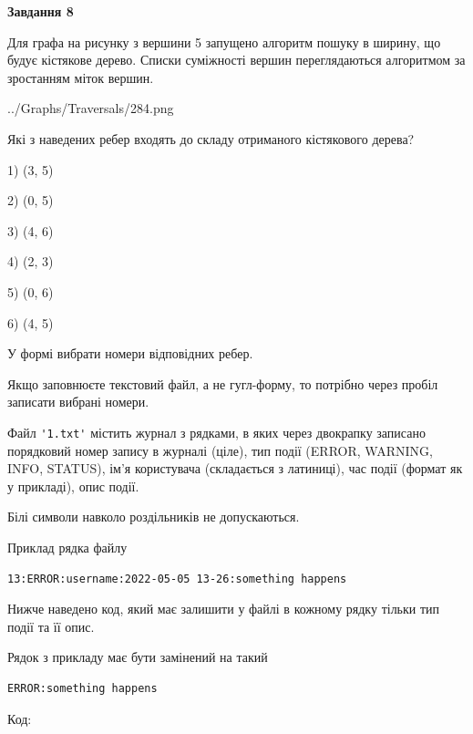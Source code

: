 \documentclass[12pt, ukrainian]{article}
\def\code#1{\Verb!#1!}
\begin{document}
{\begin {large}
{\begin {center}\textbf{Завдання 8}\end {center}}\par
Для графа на рисунку з вершини 5 запущено алгоритм пошуку в ширину, що будує кістякове дерево. Списки суміжності вершин переглядаються алгоритмом за зростанням міток вершин.\par
\begin{center}
	{../Graphs/Traversals/284.png}
\end{center}
\par Які з наведених ребер входять до складу отриманого кістякового дерева?\par
1) (3, 5)\par
2) (0, 5)\par
3) (4, 6)\par
4) (2, 3)\par
5) (0, 6)\par
6) (4, 5)\par
{\vskip 15pt} У формі вибрати номери відповідних ребер.


Якщо заповнюєте текстовий файл, а не гугл-форму, то потрібно через пробіл записа\-ти вибрані номери.\par
\newpage


Файл \code{'1.txt'} містить журнал з рядками, в яких через двокрапку записано поряд\-ко\-вий номер запису в журналі (ціле), тип події (ERROR, WARNING, INFO, STATUS), ім'я користувача (складається з латиниці), час події (фор\-мат як у прикладі), опис події.

Білі символи навколо роздільників не допускаються.

Приклад рядка файлу



\begin{verbatim}
13:ERROR:username:2022-05-05 13-26:something happens
\end{verbatim}


Нижче наведено код, який має залишити у файлі в кожному рядку тільки тип події та її опис.

Рядок з прикладу має бути замінений на такий



\begin{verbatim}
ERROR:something happens
\end{verbatim}




Код:




\end{large}}
\end{document}

